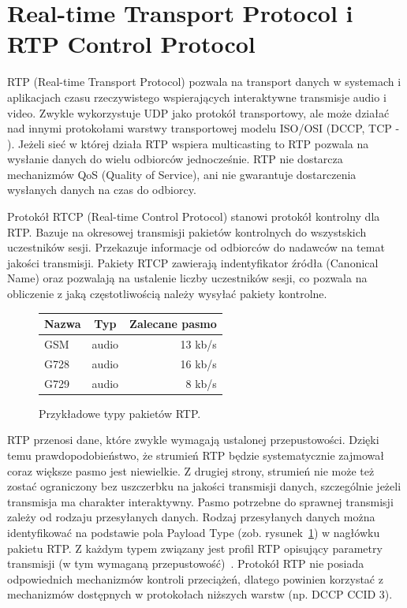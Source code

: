 \section{Real-time Transport Protocol i RTP Control Protocol}
\label{sec:rtp}

RTP (Real-time Transport Protocol) pozwala na transport danych w systemach i aplikacjach czasu rzeczywistego wspierających interaktywne transmisje audio i video. Zwykle wykorzystuje UDP jako protokół transportowy, ale może działać nad innymi protokołami warstwy transportowej modelu ISO/OSI (DCCP, TCP - \cite{RFC3550, RFC5762}). Jeżeli sieć w której działa RTP wspiera multicasting to RTP pozwala na wysłanie danych do wielu odbiorców jednocześnie. RTP nie dostarcza mechanizmów QoS (Quality of Service), ani nie gwarantuje dostarczenia wysłanych danych na czas do odbiorcy.

Protokół RTCP (Real-time Control Protocol) stanowi protokół kontrolny dla RTP. Bazuje na okresowej transmisji pakietów kontrolnych do wszystskich uczestników sesji. Przekazuje informacje od odbiorców do nadawców na temat jakości transmisji. Pakiety RTCP zawierają indentyfikator źródła (Canonical Name) oraz pozwalają na ustalenie liczby uczestników sesji, co pozwala na obliczenie z jaką częstotliwością należy wysyłać pakiety kontrolne.

\begin{figure}[h!]
	\centering
	\begin{tabular}{ l | c | r }
  		Nazwa & Typ & Zalecane pasmo \\
  		\hline
  		GSM & audio & 13 kb/s \\
  		G728 & audio & 16 kb/s  \\
  		G729 & audio & 8 kb/s  \\
	\end{tabular}
	\caption{Przykładowe typy pakietów RTP.}
	\label{RTP_table}
\end{figure}

RTP przenosi dane, które zwykle wymagają ustalonej przepustowości. Dzięki temu prawdopodobieństwo, że strumień RTP będzie systematycznie zajmował coraz większe pasmo jest niewielkie. Z drugiej strony, strumień nie może też zostać ograniczony bez uszczerbku na jakości transmisji danych, szczególnie jeżeli transmisja ma charakter interaktywny. Pasmo potrzebne do sprawnej transmisji zależy od rodzaju przesyłanych danych. Rodzaj przesyłanych danych można identyfikować na podstawie pola Payload Type (zob. rysunek~\ref{RTP_table}) w nagłówku pakietu RTP. Z każdym typem związany jest profil RTP opisujący parametry transmisji (w tym wymaganą przepustowość)~\cite{RFC3551}. Protokół RTP nie posiada odpowiednich mechanizmów kontroli przeciążeń, dlatego powinien korzystać z mechanizmów dostępnych w protokołach niższych warstw (np. DCCP CCID 3).


